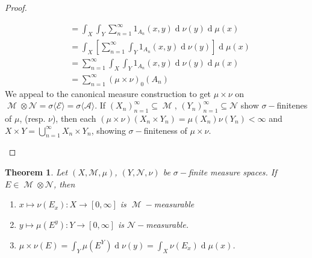 \documentclass[12pt, a4paper]{memoir}
\newtheorem{theorem}{Theorem}[section]
\theoremstyle{nonumberplain}
\newtheorem{proof}{Proof}
\DeclareMathOperator{\M}{\mathcal{M}}
\renewcommand{\d}[1]{\ensuremath{\operatorname{d}\!{#1}}} %
\begin{document}
\begin{proof}
\begin{enumerate}
\begin{align*}
                                    &= \int_X\int_Y\sum_{n=1}^\infty 1_{A_n}(x,y)\d{\nu(y)}\d{\mu(x)}\\
                                    &= \int_X\left[\sum_{n=1}^\infty\int_Y 1_{A_n}(x,y)\d{\nu(y)}\right]\d{\mu(x)}\\
                                    &= \sum_{n=1}^\infty\int_X\int_Y 1_{A_n}(x,y)\d{\nu(y)}\d{\mu(x)}\\
                                    &= \sum_{n=1}^\infty(\mu\times\nu)_0(A_n)
            \end{align*}
            We appeal to the canonical measure construction to get $\mu\times\nu$ on $\M\otimes\mathcal{N}=\sigma\langle\mathcal{E}\rangle=\sigma\langle\mathcal{A}\rangle$.
            If $(X_n)_{n=1}^\infty\subseteq\M$, $(Y_n)_{n=1}^\infty\subseteq\mathcal{N}$ show $\sigma-$finitenes of $\mu$, (resp. $\nu$), then each $(\mu\times\nu)(X_n\times Y_n)=\mu(X_n)\nu(Y_n)<\infty$ and $X\times Y=\bigcup_{n=1}^\infty X_n\times Y_n$, showing $\sigma-$finiteness of $\mu\times\nu$.
    \end{enumerate}
\end{proof}
\begin{theorem}
    Let $(X,\mathcal{M},\mu)$, $(Y,\mathcal{N},\nu)$ be $\sigma-$finite measure spaces.
    If $E\in\M\otimes\mathcal{N}$, then
    \begin{enumerate}[nolistsep,label=(\roman*)]
        \item $x\mapsto\nu(E_x):X\to[0,\infty]$ is $\M-$measurable
        \item $y\mapsto\mu(E^y):Y\to[0,\infty]$ is $\mathcal{N}-$measurable.
        \item $\mu\times\nu(E)=\int_Y\mu(E^Y)\d{\nu(y)}=\int_X\nu(E_x)\d{\mu(x)}$.
    \end{enumerate}
\end{theorem}
\end{document}
